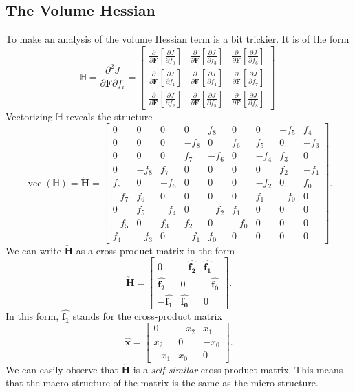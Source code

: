 \subsection{The Volume Hessian}
To make an analysis of the volume Hessian term is a bit trickier. It is of the form
\[
\mathbb{H} = \frac{\partial^2 J}{\partial \mathbf{F} \partial f_i} = \left[\begin{array}{ccc}{\frac{\partial}{\partial \mathbf{F}}\left[\frac{\partial J}{\partial f_0}\right]} & {\frac{\partial}{\partial \mathbf{F}}\left[\frac{\partial J}{\partial f_3}\right]} & {\frac{\partial}{\partial \mathbf{F}}\left[\frac{\partial J}{\partial f_6}\right]} \\ {\frac{\partial}{\partial \mathbf{F}}\left[\frac{\partial J}{\partial f_1}\right]} & {\frac{\partial}{\partial \mathbf{F}}\left[\frac{\partial J}{\partial f_4}\right]} & {\frac{\partial}{\partial \mathbf{F}}\left[\frac{\partial J}{\partial f_7}\right]} \\ {\frac{\partial}{\partial \mathbf{F}}\left[\frac{\partial J}{\partial f_2}\right]} & {\frac{\partial}{\partial \mathbf{F}}\left[\frac{\partial J}{\partial f_5}\right]} & {\frac{\partial}{\partial \mathbf{F}}\left[\frac{\partial J}{\partial f_8}\right]} \end{array}\right].
\]
Vectorizing $\mathbb{H}$ reveals the structure
\[
\operatorname{vec}(\mathbb{H}) = \mathbf{\check{H}} = \begin{bmatrix} 0 & 0 & 0 & 0 & f_8 & 0 & 0 & -f_5 & f_4 \\ 0 & 0 & 0 & -f_8 & 0 & f_6 & f_5 & 0 & -f_3 \\ 0 & 0 & 0 & f_7 & -f_6 & 0 & -f_4 & f_3 & 0 \\ 0 & -f_8 & f_7 & 0 & 0 & 0 & 0 & f_2 & -f_1 \\ f_8 & 0 & -f_6 & 0 & 0 & 0 & -f_2 & 0 & f_0 \\ -f_7 & f_6 & 0 & 0 & 0 & 0 & f_1 & -f_0 & 0 \\ 0 & f_5 & -f_4 & 0 & -f_2 & f_1 & 0 & 0 & 0 \\ -f_5 & 0 & f_3 & f_2 & 0 & -f_0 & 0 & 0 & 0 \\ f_4 & -f_3 & 0 & -f_1 & f_0 & 0 & 0 & 0 & 0 \end{bmatrix}.
\]
We can write $\mathbf{\check{H}}$ as a cross-product matrix in the form
\[
\mathbf{\check{H}} = \left[ \begin{matrix}
0 & -\mathbf{\widehat{f_2}} & \mathbf{\widehat{f_1}} \\ \mathbf{\widehat{f_2}} & 0 & -\mathbf{\widehat{f_0}} \\ -\mathbf{\widehat{f_1}} & \mathbf{\widehat{f_0}} & 0 \end{matrix} \right].
\]
In this form, $\mathbf{\widehat{f_1}}$ stands for the cross-product matrix
\[
\mathbf{\widehat{x}} = \left[ \begin{matrix}
0 & -x_2 & x_1 \\ x_2 & 0 & -x_0 \\ -x_1 & x_0 & 0 \end{matrix} \right].
\]
We can easily observe that $\mathbf{\check{H}}$ is a \textit{self-similar} cross-product matrix. This means that  the macro structure of the matrix is the same as the micro structure.

